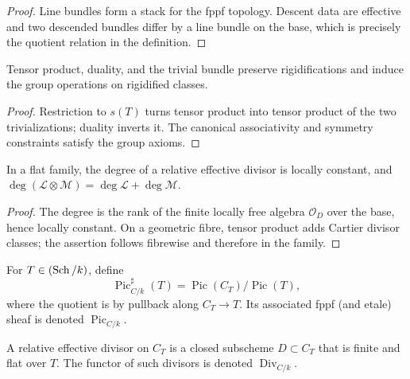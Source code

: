 \begin{proof}
  Line bundles form a stack for the fppf topology.  Descent data are
  effective and two descended bundles differ by a line bundle on the base,
  which is precisely the quotient relation in the definition.
\end{proof}

\begin{lemma}
  \label{mk-lem-rigidified-tensor}
  \cite{kleiman-picard}
  Tensor product, duality, and the trivial bundle preserve rigidifications and
  induce the group operations on rigidified classes.
\end{lemma}

\begin{proof}
  Restriction to \(s(T)\) turns tensor product into tensor product of the two
  trivializations; duality inverts it.  The canonical associativity and
  symmetry constraints satisfy the group axioms.
\end{proof}

\begin{proposition}
  \label{mk-prop-relative-degree-additive}
  \cite{kleiman-picard}
  In a flat family, the degree of a relative effective divisor is locally
  constant, and
  \(\deg(\mathcal L\otimes\mathcal M)=\deg\mathcal L+\deg\mathcal M\).
\end{proposition}

\begin{proof}
  The degree is the rank of the finite locally free algebra
  \(\mathcal O_D\) over the base, hence locally constant.  On a geometric
  fibre, tensor product adds Cartier divisor classes; the assertion follows
  fibrewise and therefore in the family.
\end{proof}

\begin{definition}
  \label{mk-def-picard-functor}
  \cite[Def.~2.2]{kleiman-picard}
  For \(T\in(\operatorname{Sch}/k)\), define
  \[
    \operatorname{Pic}^{\sharp}_{C/k}(T)=\operatorname{Pic}(C_T)/
    \operatorname{Pic}(T),
  \]
  where the quotient is by pullback along \(C_T\to T\).  Its associated
  fppf (and etale) sheaf is denoted \(\operatorname{Pic}_{C/k}\).
\end{definition}

\begin{definition}
  \label{mk-def-relative-divisor}
  \cite[Thm.~3.7]{kleiman-picard}
  A relative effective divisor on \(C_T\) is a closed subscheme \(D\subset C_T\)
  that is finite and flat over \(T\).  The functor of such divisors is denoted
  \(\operatorname{Div}_{C/k}\).
\end{definition}

